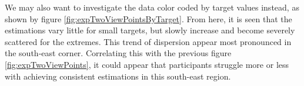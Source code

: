 %
%
%

We may also want to investigate the data color coded by target values instead, as shown by figure \ref{fig:expTwoViewPointsByTarget}. From here, it is seen that the estimations vary  little for small targets, but slowly increase and become severely scattered for the extremes. This trend of dispersion appear most pronounced in the south-east corner. Correlating this with the previous figure \ref{fig:expTwoViewPoints}, it could appear that participants struggle more or less with achieving consistent estimations in this south-east region.

